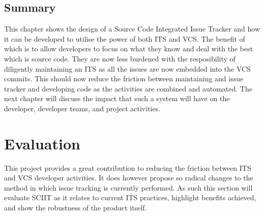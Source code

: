 \documentclass{mproj}
\begin{document}
\section{Summary}

This chapter shows the design of a Source Code Integrated Issue Tracker and how it can be developed to utilise the power of both ITS and VCS. The benefit of which is to allow developers to focus on what they know and deal with the best which is source code. They are now less burdened with the resposibility of diligently maintaining an ITS as all the issues are now embedded into the VCS  commits. This should now reduce the friction between maintaining and issue tracker and developing code as the activities are combined and automated. The next chapter will discuss the impact that such a system will have on the developer, developer teams, and project activities.

\chapter{Evaluation}\label{evaluation}

This project provides a great contribution to reducing the friction between ITS and VCS developer activities. It does however propose so radical changes to the method in which issue tracking is currently performed. As such this section will evaluate SCIIT as it relates to current ITS practices, highlight benefits achieved, and show the robustness of the product itself.





\end{document}

